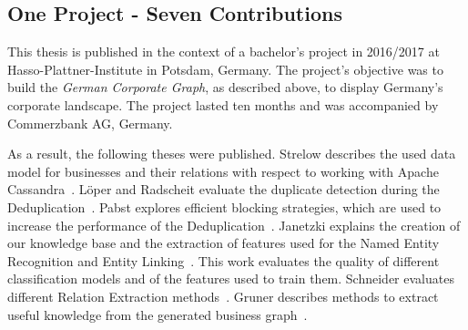 \subsection*{One Project - Seven Contributions}
This thesis is published in the context of a bachelor's project in 2016/2017 at Hasso-Plattner-Institute in Potsdam, Germany. The project's objective was to build the \emph{German Corporate Graph}, as described above, to display Germany's corporate landscape. The project lasted ten months and was accompanied by Commerzbank AG, Germany.\par
As a result, the following theses were published. Strelow describes the used data model for businesses and their relations with respect to working with Apache Cassandra\ \cite{strelow}. Löper and Radscheit evaluate the duplicate detection during the Deduplication\ \cite{loeperradscheit}. Pabst explores efficient blocking strategies, which are used to increase the performance of the Deduplication\ \cite{pabst}. Janetzki explains the creation of our knowledge base and the extraction of features used for the Named Entity Recognition and Entity Linking\ \cite{janetzki}. This work evaluates the quality of different classification models and of the features used to train them. Schneider evaluates different Relation Extraction methods\ \cite{schneider}. Gruner describes methods to extract useful knowledge from the generated business graph\ \cite{gruner}.\par
